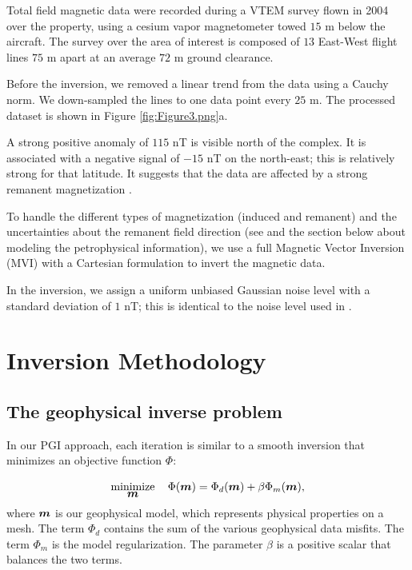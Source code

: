 \documentclass[paper, twocolumn]{geophysics} %
\newcommand{\mathbf}[1]{
  \hbox{\mathversion{bold}$#1$}}
\begin{document}
Total field magnetic data were recorded during a VTEM survey flown in 2004 over the property, using a cesium vapor magnetometer towed $15$ m below the aircraft. The survey over the area of interest is composed of $13$ East-West flight lines $75$ m apart at an average $72$ m ground clearance.

Before the inversion, we removed a linear trend from the data using a Cauchy norm. We down-sampled the lines to one data point every $25$ m. The processed dataset is shown in Figure \ref{fig:Figure3.png}a.

A strong positive anomaly of $115$ nT is visible north of the complex. It is associated with a negative signal of $-15$ nT on the north-east; this is relatively strong for that latitude. It suggests that the data are affected by a strong remanent magnetization \citep{TKCpaper}.

To handle the different types of magnetization (induced and remanent) and the uncertainties about the remanent field direction (see \citet{TKCpaper} and the section below about modeling the petrophysical information), we use a full Magnetic Vector Inversion (MVI) with a Cartesian formulation \citep{MVI} to invert the magnetic data.

In the inversion, we assign a uniform unbiased Gaussian noise level with a standard deviation of $1$ nT; this is identical to the noise level used in \citet{TKCpaper}.


\section{Inversion Methodology}

\subsection{The geophysical inverse problem}

In our PGI approach, each iteration is similar to a smooth inversion \citep{Tutorial} that minimizes an objective function $\Phi$:

\begin{equation}
\mathop{\hbox{minimize}}\limits_{\mathbf{m}}\quad\Phi(\mathbf{m}) = \Phi_d(\mathbf{m}) + \beta \Phi_m(\mathbf{m}), \label{tikhonov}
\end{equation}
where $\mathbf{m}$ is our geophysical model, which represents physical properties on a mesh. The term $\Phi_d$ contains the sum of the various geophysical data misfits. The term $\Phi_m$ is the model regularization. The parameter $\beta$ is a positive scalar that balances the two terms.
\end{document}

